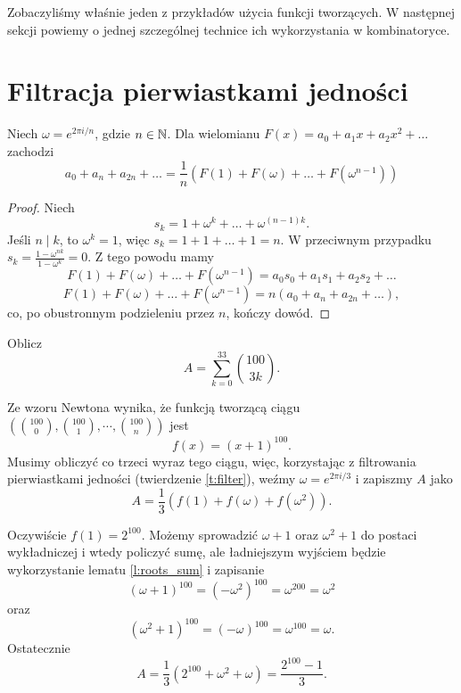 \documentclass{scrartcl}
\begin{document}
    Zobaczyliśmy właśnie jeden z przykładów użycia funkcji tworzących. W następnej sekcji powiemy o jednej szczególnej technice ich wykorzystania w kombinatoryce.

\section{Filtracja pierwiastkami jedności}
    \begin{theorem}
        \label{t:filter}
        Niech $\omega = e^{2\pi i/n}$, gdzie $n \in \mathbb N$. Dla wielomianu $F(x) = a_0 + a_1x + a_2x^2 + \ldots$ zachodzi
        $$ a_0 + a_n + a_{2n} + \ldots = \frac{1}{n}\left(F(1) + F(\omega) + \ldots + F(\omega^{n - 1})\right) $$
    \end{theorem}
    \begin{proof}
        Niech
        $$ s_k = 1 + \omega^k + \ldots + \omega^{(n - 1)k}. $$
        Jeśli $n \mid k$, to $\omega^k = 1$, więc $s_k = 1 + 1 + \ldots + 1 = n$. W przeciwnym przypadku $s_k = \frac{1 - \omega^{nk}}{1 - \omega^k} = 0$.
        Z tego powodu mamy
        $$ F(1) + F(\omega) + \ldots + F(\omega^{n - 1}) = a_0s_0 + a_1s_1 + a_2s_2 + \ldots $$
        $$ F(1) + F(\omega) + \ldots + F(\omega^{n - 1}) = n(a_0 + a_n + a_{2n} + \ldots), $$
        co, po obustronnym podzieleniu przez $n$, kończy dowód.
    \end{proof}

    \begin{example}
        Oblicz $$ A = \sum_{k = 0}^{33} \binom{100}{3k}. $$
    \end{example}
    \begin{solution}
        Ze wzoru Newtona wynika, że funkcją tworzącą ciągu $\left(\binom{100}{0}, \binom{100}{1}, \cdots, \binom{100}{n}\right)$ jest
        $$ f(x) = (x + 1)^{100}. $$
        Musimy obliczyć co trzeci wyraz tego ciągu, więc, korzystając z filtrowania pierwiastkami jedności (twierdzenie \ref{t:filter}), weźmy $\omega = e^{2\pi i /3}$ i zapiszmy $A$ jako
        $$ A = \frac{1}{3}\left(f(1) + f(\omega) + f(\omega^2)\right). $$

        Oczywiście $f(1) = 2^{100}$. Możemy sprowadzić $\omega + 1$ oraz $\omega^2 + 1$ do postaci wykładniczej i wtedy policzyć sumę, ale ładniejszym wyjściem będzie wykorzystanie lematu \ref{l:roots_sum} i zapisanie
        $$ (\omega + 1)^{100} = (-\omega^2)^{100} = \omega^{200} = \omega^2 $$
        oraz
        $$ (\omega^2 + 1)^{100} = (-\omega)^{100} = \omega^{100} = \omega. $$
        Ostatecznie
        $$ A = \frac{1}{3}\left(2^{100} + \omega^2 + \omega\right) = \frac{2^{100} - 1}{3}. $$

    \end{solution}
\end{document}

